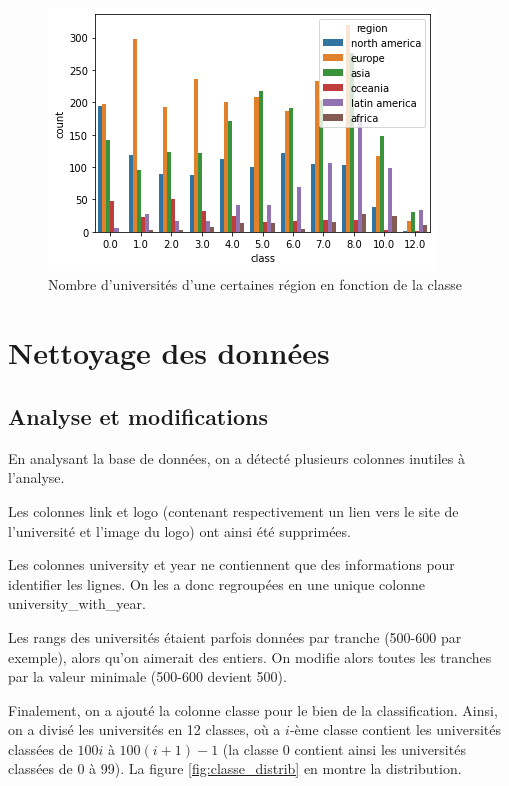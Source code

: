 \documentclass[twocolumns]{udes_rapport}
\begin{document}
    \begin{figure}[h!]
        \centering
        \includegraphics[scale=0.6]{Images/region_by_class.png}
        \caption{Nombre d'universités d'une certaines région en fonction de la classe}
        \label{fig:region_by_class}
    \end{figure}

\section{Nettoyage des données}\label{sec:cleaning}
    
    \subsection{Analyse et modifications}\label{subsec:analyis_modifications}
        
        En analysant la base de données, on a détecté plusieurs colonnes inutiles à l'analyse.

        Les colonnes \textsf{link} et \textsf{logo} (contenant respectivement un lien vers le site de l'université et l'image du logo) ont ainsi été supprimées.
        
        Les colonnes \textsf{university} et \textsf{year} ne contiennent que des informations pour identifier les lignes. On les a donc regroupées en une unique colonne \textsf{university\_with\_year}.
        
        Les rangs des universités étaient parfois données par tranche (500-600 par exemple), alors qu'on aimerait des entiers. On modifie alors toutes les tranches par la valeur minimale (500-600 devient 500).
        
        Finalement, on a ajouté la colonne \textsf{classe} pour le bien de la classification. Ainsi, on a divisé les universités en 12 classes, où a $i$-ème classe contient les universités classées de $100i$ à $100(i+1) - 1$ (la classe 0 contient ainsi les universités classées de 0 à 99). La figure \ref{fig:classe_distrib} en montre la distribution.
        
\end{document}

